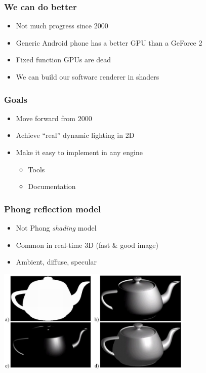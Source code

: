 \documentclass{beamer}
\begin{document}
\begin{frame}\frametitle{We can do better}

\begin{itemize}
\item
  Not much progress since 2000
\item
  Generic Android phone has a better GPU than a GeForce 2
\item
  Fixed function GPUs are dead
\item
  We can build our software renderer in shaders
\end{itemize}

\end{frame}

\begin{frame}\frametitle{Goals}

\begin{itemize}
\item
  Move forward from 2000
\item
  Achieve ``real'' dynamic lighting in 2D
\item
  Make it easy to implement in any engine

  \begin{itemize}
  \item
    Tools
  \item
    Documentation
  \end{itemize}
\end{itemize}

\end{frame}

\begin{frame}\frametitle{Phong reflection model}

\begin{itemize}
\item
  Not Phong \emph{shading} model
\item
  Common in real-time 3D (fast \& good image)
\item
  Ambient, diffuse, specular
\end{itemize}

\begin{center}
\includegraphics[width=0.7\textwidth]{ads.jpg}
\end{center}

\end{frame}
\end{document}
